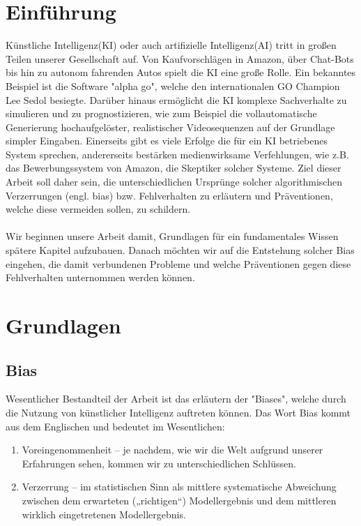 \documentclass[12pt,oneside,a4paper,parskip]{scrbook}
\begin{document}
\chapter{Einführung}
\label{chapter:intro}
Künstliche Intelligenz(KI) oder auch artifizielle Intelligenz(AI) tritt in großen Teilen unserer Gesellschaft auf. Von Kaufvorschlägen in Amazon, über Chat-Bots bis hin zu autonom fahrenden Autos spielt die KI eine große Rolle. Ein bekanntes Beispiel ist die Software "alpha go", welche den internationalen GO Champion Lee Sedol besiegte\cite{alphaGo}. Darüber hinaus ermöglicht die KI komplexe Sachverhalte zu simulieren und zu prognostizieren, wie zum Beispiel die vollautomatische Generierung hochaufgelöster, realistischer Videosequenzen auf der Grundlage simpler Eingaben\cite{videoToVideo}.
Einerseits gibt es viele Erfolge die für ein KI betriebenes System sprechen, andererseits bestärken medienwirksame Verfehlungen, wie z.B. das Bewerbungssystem von Amazon\cite{amazon}, die Skeptiker solcher Systeme. Ziel dieser Arbeit soll daher sein, die unterschiedlichen Ursprünge solcher algorithmischen Verzerrungen (engl. bias) bzw. Fehlverhalten zu erläutern und Präventionen, welche diese vermeiden sollen, zu schildern.
\\\\
Wir beginnen unsere Arbeit damit, Grundlagen für ein fundamentales Wissen spätere Kapitel aufzubauen. Danach möchten wir auf die Entstehung solcher Bias eingehen, die damit verbundenen Probleme und welche Präventionen gegen diese Fehlverhalten unternommen werden können.

\chapter{Grundlagen}
\section{Bias}
Wesentlicher Bestandteil der Arbeit ist das erläutern der "Biases", welche durch die Nutzung von künstlicher Intelligenz auftreten können. Das Wort Bias kommt aus dem Englischen und bedeutet im Wesentlichen:

\begin{enumerate}
	\item Voreingenommenheit – je nachdem, wie wir die Welt aufgrund unserer Erfahrungen sehen, kommen wir zu unterschiedlichen Schlüssen.
	\item Verzerrung – im statistischen Sinn als mittlere systematische Abweichung zwischen dem erwarteten („richtigen“) Modellergebnis und dem mittleren wirklich eingetretenen Modellergebnis. 
\end{enumerate}
\end{document}
